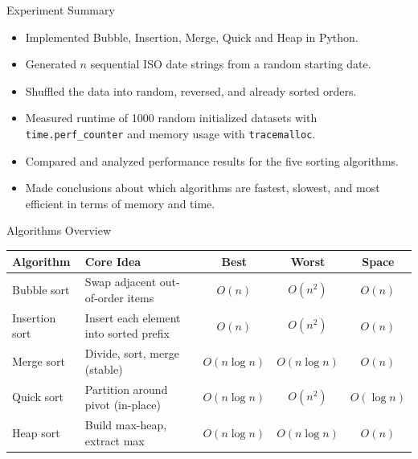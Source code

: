 \documentclass[aspectratio=169]{beamer}
\begin{document}
\begin{frame}{Experiment Summary}
  \begin{itemize}
    \item Implemented Bubble, Insertion, Merge, Quick and Heap in Python.
    \item Generated $n$ sequential ISO date strings from a random starting date.
    \item Shuffled the data into random, reversed, and already sorted orders.
    \item Measured runtime of 1000 random initialized datasets with \texttt{time.perf\_counter} and memory usage with \texttt{tracemalloc}.
    \item Compared and analyzed performance results for the five sorting algorithms.
    \item Made conclusions about which algorithms are fastest, slowest, and most efficient in terms of memory and time.
  \end{itemize}
\end{frame}


\begin{frame}{Algorithms Overview}
  \vspace*{-0.5em}
  \scriptsize
  \begin{table}[ht]
    \centering
    \begin{tabular}{@{}l p{7cm} c c c@{}}
      \toprule
      \textbf{Algorithm} & \textbf{Core Idea} & \textbf{Best} & \textbf{Worst} & \textbf{Space} \\
      \midrule
      Bubble sort    & Swap adjacent out-of-order items               & $O(n)$        & $O(n^2)$      & $O(n)$       \\
      Insertion sort & Insert each element into sorted prefix         & $O(n)$        & $O(n^2)$      & $O(n)$       \\
      Merge sort     & Divide, sort, merge (stable)                   & $O(n\log n)$  & $O(n\log n)$  & $O(n)$       \\
      Quick sort     & Partition around pivot (in-place)              & $O(n\log n)$  & $O(n^2)$      & $O(\log n)$  \\
      Heap sort      & Build max-heap, extract max                    & $O(n\log n)$  & $O(n\log n)$  & $O(n)$       \\
      \bottomrule
    \end{tabular}
  \end{table}
\end{frame}
\end{document}

